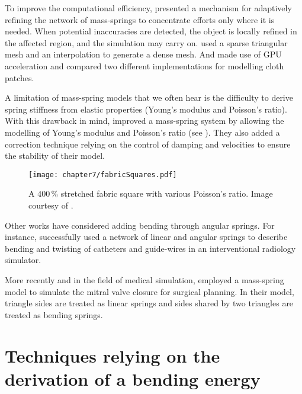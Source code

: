 To improve the computational efficiency, \cite{Hutchinson96} presented a mechanism for adaptively refining the network of mass-springs to concentrate efforts only where it is needed. When potential inaccuracies are detected, the object is locally refined in the affected region, and the simulation may carry on. \cite{Oshita01} used a sparse triangular mesh and an interpolation to generate a dense mesh. And \cite{Georgii05} made use of GPU acceleration and compared two different implementations for modelling cloth patches.

A limitation of mass-spring models that we often hear is the difficulty to derive spring stiffness from elastic properties (Young's modulus and Poisson's ratio). With this drawback in mind, \cite{Volino97} improved a mass-spring system by allowing the modelling of Young's modulus and Poisson's ratio (see ). They also added a correction technique relying on the control of damping and velocities to ensure the stability of their model. 
%
\begin{figure}[ht]
\begin{center}
\texttt{[image: chapter7/fabricSquares.pdf]}
\caption[A $400\,$\% stretched fabric square]{A $400\,$\% stretched fabric square with various Poisson's ratio. Image courtesy of \cite{Volino97}.}
\label{chap7:fig-fabricSquares}
\end{center}
\end{figure}

Other works have considered adding bending through angular springs. 
For instance, \cite{Wang07} successfully used a network of linear and angular springs to describe bending and twisting of catheters and guide-wires in an interventional radiology simulator. 

More recently and in the field of medical simulation, \cite{Hammer08} employed a mass-spring model to simulate the mitral valve closure for surgical planning. In their model, triangle sides are treated as linear springs and sides shared by two triangles are treated as bending springs. 

	
\section{Techniques relying on the derivation of a bending energy}

